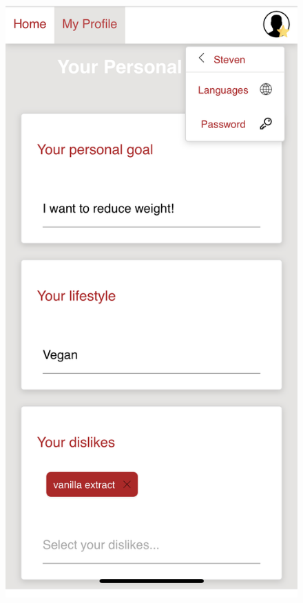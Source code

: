 \begin{figure}[htp]
	\captionsetup{justification=centering}
	\centering
		\includegraphics[scale=0.12]{Ressourcen/img/screenshots/iphone1.png}\hfill

\end{figure}
